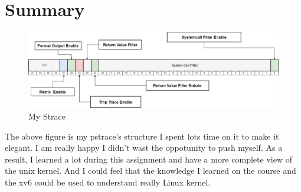 \documentclass[11pt,oneside,a4paper]{article}
\begin{document}
\section{Summary}

\begin{figure}[H]
    \includegraphics[width=4.75in]{pstrace.png}
    \centering
    \caption{My Strace}
\end{figure}

The above figure is my pstrace's structure I spent lots time on it to make it elegant.
I am really happy I didn't wast the oppotunity
to push myself. As a result, I learned a lot during this assignment and have a more 
complete view of the unix kernel. And I could feel that the knowledge I learned on 
the course and the xv6 could be used to understand really Linux kernel. 
\end{document}
